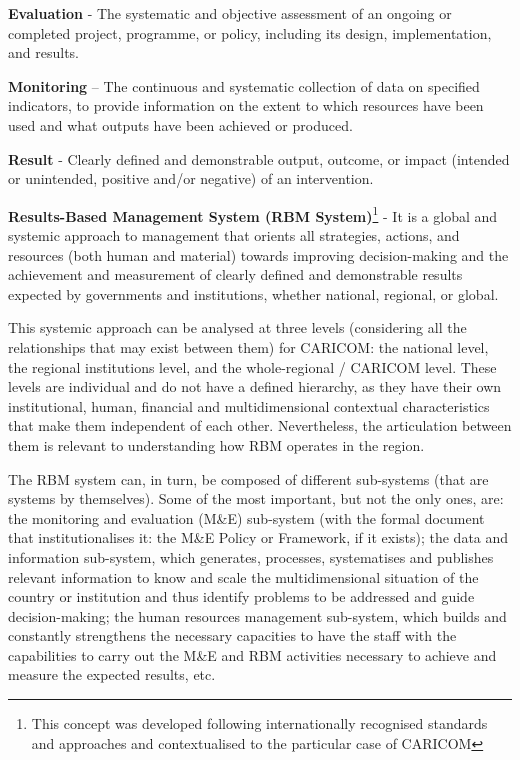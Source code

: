 \documentclass[
  10pt,
]{book}
\begin{document}
\textbf{Evaluation} - The systematic and objective assessment of an ongoing or completed project, programme, or policy, including its design, implementation, and results.

\textbf{Monitoring} -- The continuous and systematic collection of data on specified indicators, to provide information on the extent to which resources have been used and what outputs have been achieved or produced.

\textbf{Result} - Clearly defined and demonstrable output, outcome, or impact (intended or unintended, positive and/or negative) of an intervention.

\textbf{Results-Based Management System (RBM System)}\footnote{This concept was developed following internationally recognised standards and approaches and contextualised to the particular case of CARICOM} - It is a global and systemic approach to management that orients all strategies, actions, and resources (both human and material) towards improving decision-making and the achievement and measurement of clearly defined and demonstrable results expected by governments and institutions, whether national, regional, or global.

This systemic approach can be analysed at three levels (considering all the relationships that may exist between them) for CARICOM: the national level, the regional institutions level, and the whole-regional / CARICOM level. These levels are individual and do not have a defined hierarchy, as they have their own institutional, human, financial and multidimensional contextual characteristics that make them independent of each other. Nevertheless, the articulation between them is relevant to understanding how RBM operates in the region.

The RBM system can, in turn, be composed of different sub-systems (that are systems by themselves). Some of the most important, but not the only ones, are: the monitoring and evaluation (M\&E) sub-system (with the formal document that institutionalises it: the M\&E Policy or Framework, if it exists); the data and information sub-system, which generates, processes, systematises and publishes relevant information to know and scale the multidimensional situation of the country or institution and thus identify problems to be addressed and guide decision-making; the human resources management sub-system, which builds and constantly strengthens the necessary capacities to have the staff with the capabilities to carry out the M\&E and RBM activities necessary to achieve and measure the expected results, etc.
\end{document}
